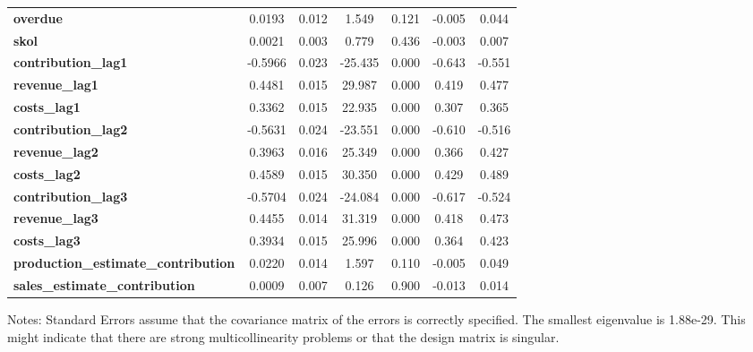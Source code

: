 \begin{center}
\begin{tabular}{lcccccc}
\textbf{overdue}                            &       0.0193  &        0.012     &     1.549  &         0.121        &       -0.005    &        0.044     \\
\textbf{skol}                               &       0.0021  &        0.003     &     0.779  &         0.436        &       -0.003    &        0.007     \\
\textbf{contribution\_lag1}                 &      -0.5966  &        0.023     &   -25.435  &         0.000        &       -0.643    &       -0.551     \\
\textbf{revenue\_lag1}                      &       0.4481  &        0.015     &    29.987  &         0.000        &        0.419    &        0.477     \\
\textbf{costs\_lag1}                        &       0.3362  &        0.015     &    22.935  &         0.000        &        0.307    &        0.365     \\
\textbf{contribution\_lag2}                 &      -0.5631  &        0.024     &   -23.551  &         0.000        &       -0.610    &       -0.516     \\
\textbf{revenue\_lag2}                      &       0.3963  &        0.016     &    25.349  &         0.000        &        0.366    &        0.427     \\
\textbf{costs\_lag2}                        &       0.4589  &        0.015     &    30.350  &         0.000        &        0.429    &        0.489     \\
\textbf{contribution\_lag3}                 &      -0.5704  &        0.024     &   -24.084  &         0.000        &       -0.617    &       -0.524     \\
\textbf{revenue\_lag3}                      &       0.4455  &        0.014     &    31.319  &         0.000        &        0.418    &        0.473     \\
\textbf{costs\_lag3}                        &       0.3934  &        0.015     &    25.996  &         0.000        &        0.364    &        0.423     \\
\textbf{production\_estimate\_contribution} &       0.0220  &        0.014     &     1.597  &         0.110        &       -0.005    &        0.049     \\
\textbf{sales\_estimate\_contribution}      &       0.0009  &        0.007     &     0.126  &         0.900        &       -0.013    &        0.014     \\
\bottomrule
\end{tabular}
\end{center}

Notes: \newline
 [1] Standard Errors assume that the covariance matrix of the errors is correctly specified. \newline
 [2] The smallest eigenvalue is 1.88e-29. This might indicate that there are \newline
 strong multicollinearity problems or that the design matrix is singular.